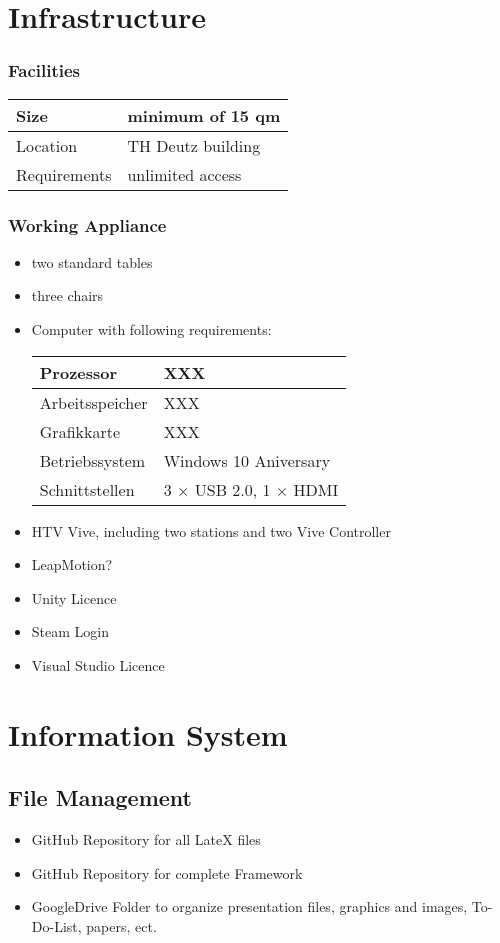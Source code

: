 \documentclass[a4paper, 12pt]{article}
\begin{document}
\section{Infrastructure}
\subsubsection{Facilities}
\begin{tabular}{|l | l | }
	\hline
 Size & minimum of 15 qm \\ \hline
 Location & TH Deutz building \\ \hline
 Requirements & unlimited access\\ 
 \hline
\end{tabular}

\subsubsection{Working Appliance}
\begin{itemize}
	\item two standard tables 
	\item three chairs
	\item Computer with following requirements: \\
\begin{tabular}{|l|l|}
	\hline
	Prozessor & XXX \\
	\hline
	Arbeitsspeicher & XXX \\
	\hline 
	Grafikkarte & XXX\\
	\hline
	Betriebssystem & Windows 10 Aniversary \\
	\hline
	Schnittstellen & 3 $\times$ USB 2.0, 1 $\times$ HDMI \\
	\hline
\end{tabular}
\item HTV Vive, including two stations and two Vive Controller
\item LeapMotion?
\item Unity Licence
\item Steam Login
\item Visual Studio Licence
\end{itemize}

\section{Information System}
\subsection{File Management}
\begin{itemize}
\item GitHub Repository for all LateX files
\item GitHub Repository for complete Framework
\item GoogleDrive Folder to organize presentation files, graphics and images, To-Do-List, papers, ect. 
\end{itemize}
\end{document}
